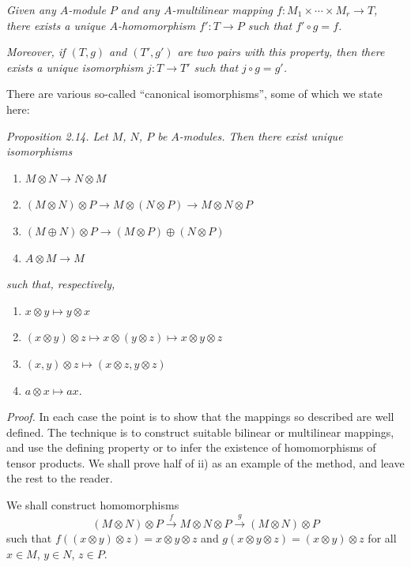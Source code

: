 \textit{Given any $A$-module $P$ and any $A$-multilinear mapping $f:M_1\times\cdots\times M_r\longrightarrow T$, there exists a unique $A$-homomorphism $f':T\longrightarrow P$ such that $f'\circ g=f$.}

\textit{Moreover, if $(T,g)$ and $(T',g')$ are two pairs with this property, then there exists a unique isomorphism $j:T\longrightarrow T'$ such that $j\circ g=g'$.} \proofbox

There are various so-called ``canonical isomorphisms'', some of which we state here:

\noindent\textit{Proposition 2.14. Let $M$, $N$, $P$ be $A$-modules. Then there exist unique isomorphisms}
\begin{enumerate}
\renewcommand{\labelenumi}{\roman{enumi})}
\item $M\otimes N\longrightarrow N\otimes M$
\item $(M\otimes N)\otimes P\longrightarrow M\otimes(N\otimes P)\longrightarrow M\otimes N\otimes P$
\item $(M\oplus N)\otimes P\longrightarrow(M\otimes P)\oplus(N\otimes P)$
\item $A\otimes M\longrightarrow M$
\end{enumerate}
\textit{such that, respectively,}
\begin{enumerate}
\renewcommand{\labelenumi}{\alph{enumi})}
\item $x\otimes y\mapsto y\otimes x$
\item $(x\otimes y)\otimes z\mapsto x\otimes(y\otimes z)\mapsto x\otimes y\otimes z$
\item $(x,y)\otimes z\mapsto(x\otimes z,y\otimes z)$
\item $a\otimes x\mapsto ax$.
\end{enumerate}

\noindent\textit{Proof.} In each case the point is to show that the mappings so described are well defined. The technique is to construct suitable bilinear or multilinear mappings, and use the defining property  or  to infer the existence of homomorphisms of tensor products. We shall prove half of ii) as an example of the method, and leave the rest to the reader.

We shall construct homomorphisms
\[
 (M\otimes N)\otimes P\xrightarrow{f}M\otimes N\otimes P\xrightarrow{g}(M\otimes N)\otimes P
\]
such that $f((x\otimes y)\otimes z)=x\otimes y\otimes z$ and $g(x\otimes y\otimes z)=(x\otimes y)\otimes z$ for all $x\in M$, $y\in N$, $z\in P$.

